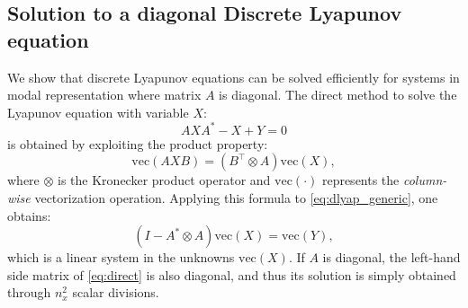 \documentclass{article} %
\renewcommand{\vec}{\text{vec}}
\begin{document}
\subsection{Solution to a diagonal Discrete Lyapunov equation}
We show that discrete Lyapunov equations can be solved  efficiently for systems in modal representation where matrix $A$ is diagonal.
The direct method to solve the Lyapunov equation with variable $X$:
\begin{equation}
    \label{eq:dlyap_generic}
    AXA^{*} - X + Y = 0
\end{equation}
is obtained by exploiting the product property:
\begin{equation}
\vec(A X B) = (B^\top \otimes A) \vec(X),
\end{equation}
where $\otimes$ is the Kronecker product operator and $\vec(\cdot)$ represents the \emph{column-wise} vectorization operation.
Applying this formula to \eqref{eq:dlyap_generic}, one obtains:
\begin{equation}
\label{eq:direct}
(I - A^* \otimes A) \vec (X) = \vec (Y),
\end{equation}
which is a linear system in the unknowns $\vec (X)$. If $A$ is diagonal, the left-hand side matrix of \eqref{eq:direct} is also diagonal, and thus its solution is simply obtained through $n_x^2$ scalar divisions.




\end{document}
